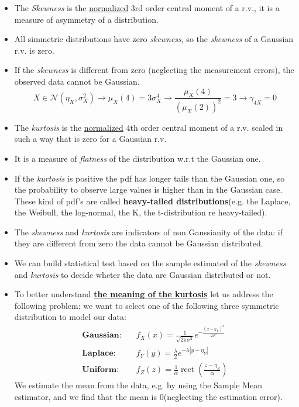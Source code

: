 \begin{itemize}
\item The \textit{Skewness} is the \underline{normalized} 3rd order central moment of a r.v., it is a measure of asymmetry of a distribution.
\item All simmetric distributions have zero \textit{skewness}, so the \textit{skewness} of a Gaussian r.v. is zero.
\item If the \textit{skewness} is different from zero (neglecting the measurement errors), the observed data cannot be Gaussian. 
\[
X \in \mathcal{N}(\eta_X, \sigma_X^2) 
\rightarrow 
\mu_X(4) = 3\sigma_X^4
\rightarrow 
\frac{\mu_X(4)}{\left(\mu_X(2)\right)^2} = 3
\rightarrow 
\gamma_{4X} = 0
\]
\item The \textit{kurtosis} is the \underline{normalized} 4th order central moment of a r.v. scaled in such a way that is zero for a Gaussian r.v.
\item It is a measure of \textit{flatness} of the distribution w.r.t the Gaussian one.
\item If the \textit{kurtosis} is positive the pdf has longer tails than the Gaussian one, so the probability to observe large values is higher than in the Gaussian case.\\
These kind of pdf's are called \textbf{heavy-tailed distributions}(e.g. the Laplace, the Weibull, the log-normal, the K, the t-distribution re heavy-tailed).
\item The \textit{skewness} and \textit{kurtosis} are indicators of non Gaussianity of the data: if they are different from zero the data cannot be Gaussian distributed.
\item We can build statistical test based on the sample estimated of the \textit{skewness} and \textit{kurtosis} to decide wheter the data are Gaussian distributed or not.
\item To better understand \underline{\textbf{the meaning of the kurtosis}} let us address the following problem: we want to select one of the following three symmetric distribution to model our data:
\[
\begin{aligned}
\textbf{Gaussian}: & \quad f_X(x) = \frac{1}{\sqrt{2\pi \sigma^2}} e^{-\frac{(x - \eta_X)^2}{2\sigma^2}} \\
\textbf{Laplace}: & \quad f_Y(y) = \frac{\lambda}{2} e^{-\lambda |y - \eta_Y|} \\
\textbf{Uniform}: & \quad f_Z(z) = \frac{1}{\alpha} \operatorname{rect} \left(\frac{z - \eta_Z}{\alpha}\right)
\end{aligned}
\]
We estimate the mean from the data, e.g. by using the Sample Mean estimator, and we find that the mean is 0(neglecting the estimation error).\\

\end{itemize}

